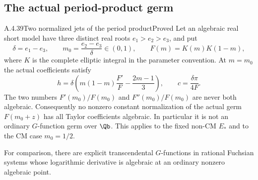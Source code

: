 \subsection{The actual period-product germ}

\begin{result}{A.4.39}{Two normalized jets of the period product}{Proved}
Let an algebraic real short model have three distinct real roots
$e_1>e_2>e_3$, and put
\[
 \delta=e_1-e_3,\qquad m_0=\frac{e_2-e_3}{\delta}\in(0,1),
 \qquad F(m)=K(m)K(1-m),
\]
where $K$ is the complete elliptic integral in the parameter
convention. At $m=m_0$ the actual coefficients satisfy
\[
 h=\delta\left(m(1-m)\frac{F'}F-\frac{2m-1}{3}\right),
 \qquad c=\frac{\delta\pi}{4F}.
\]
The two numbers $F'(m_0)/F(m_0)$ and $F''(m_0)/F(m_0)$ are never
both algebraic. Consequently no nonzero constant normalization of
the actual germ $F(m_0+z)$ has all Taylor coefficients algebraic.
In particular it is not an ordinary $G$-function germ over $\Qb$.
This applies to the fixed non-CM $E_*$ and to the CM case $m_0=1/2$.

For comparison, there are explicit transcendental $G$-functions in
rational Fuchsian systems whose logarithmic derivative is algebraic
at an ordinary nonzero algebraic point.
\end{result}


